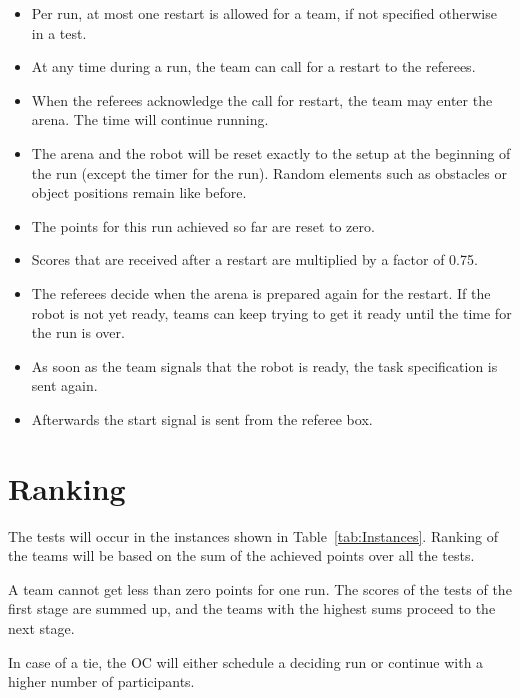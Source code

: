 \begin{itemize}

	\item Per run, at most one restart is allowed for a team, if not specified otherwise in a test.
	\item At any time during a run, the team can call for a restart to the referees.
	\item When the referees acknowledge the call for restart, the team may enter the arena. The time will continue running.
	\item The arena and the robot will be reset exactly to the setup at the beginning of the run (except the timer for the run). Random elements such as obstacles or object positions remain like before.
	\item The points for this run achieved so far are reset to zero.
	\item Scores that are received after a restart are multiplied by a factor of 0.75.
	\item The referees decide when the arena is prepared again for the restart. If the robot is not yet ready, teams can keep trying to get it ready until the time for the run is over.
	\item As soon as the team signals that the robot is ready, the task specification is sent again.
	\item Afterwards the start signal is sent from the referee box.

\end{itemize}


\section{Ranking}
The tests will occur in the instances shown in Table~\ref{tab:Instances}. Ranking of the teams will be based on the sum of the achieved points over all the tests.

A team cannot get less than zero points for one run.
The scores of the tests of the first stage are summed up, and the teams with the highest sums proceed to the next stage.

In case of a tie, the OC will either schedule a deciding run or continue with a higher number of participants.

%
%
%



